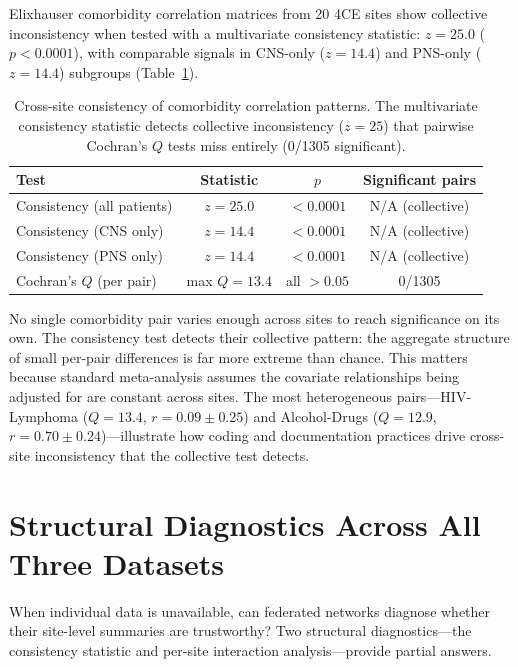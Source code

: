 \documentclass{article}
\begin{document}
Elixhauser comorbidity correlation matrices \cite{elixhauser1998} from 20
4CE sites show collective inconsistency when tested with a multivariate
consistency statistic: $z = 25.0$ ($p < 0.0001$), with comparable signals
in CNS-only ($z = 14.4$) and PNS-only ($z = 14.4$) subgroups
(Table~\ref{tab:consistency}).

\begin{table}[t]
\centering
\caption{Cross-site consistency of comorbidity correlation patterns.  The
multivariate consistency statistic detects collective inconsistency
($z = 25$) that pairwise Cochran's $Q$ tests miss entirely (0/1305
significant).}
\label{tab:consistency}
\begin{tabular}{lccc}
\toprule
Test & Statistic & $p$ & Significant pairs \\
\midrule
Consistency (all patients) & $z = 25.0$ & $< 0.0001$ & N/A (collective) \\
Consistency (CNS only) & $z = 14.4$ & $< 0.0001$ & N/A (collective) \\
Consistency (PNS only) & $z = 14.4$ & $< 0.0001$ & N/A (collective) \\
Cochran's $Q$ (per pair) & max $Q = 13.4$ & all $> 0.05$ & 0/1305 \\
\bottomrule
\end{tabular}
\end{table}

No single comorbidity pair varies enough across sites to reach significance
on its own.  The consistency test detects their collective pattern: the
aggregate structure of small per-pair differences is far more extreme than
chance.  This matters because standard meta-analysis assumes the covariate
relationships being adjusted for are constant across sites.  The most
heterogeneous pairs---HIV-Lymphoma ($Q = 13.4$, $r = 0.09 \pm 0.25$) and
Alcohol-Drugs ($Q = 12.9$, $r = 0.70 \pm 0.24$)---illustrate how coding
and documentation practices drive cross-site inconsistency that the
collective test detects.


\section{Structural Diagnostics Across All Three Datasets}

When individual data is unavailable, can federated networks diagnose
whether their site-level summaries are trustworthy?  Two structural
diagnostics---the consistency statistic and per-site interaction
analysis---provide partial answers.
\end{document}

